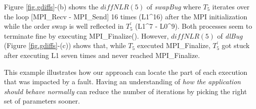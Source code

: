 Figure \ref{fig.gdiffs}-(b) shows the $diffNLR(5)$ of \textit{swapBug} where $T_5$ iterates over the loop [MPI\_Recv - MPI\_Send] 16 times (L1\^{}16) after the MPI initialization while the order swap is well reflected in $T_5^\prime$ (L1\^{}7 - L0\^{}9). Both processes seem to terminate fine by executing MPI\_Finalize(). 
However, $diffNLR(5)$ of \textit{dlBug} (Figure \ref{fig.gdiffs}-(c)) shows that, while $T_5$ executed MPI\_Finalize, $T_5^\prime$ got stuck after executing L1 seven times and never reached MPI\_Finalize.

This example illustrates how our approach can locate the part of each execution that was impacted by a fault. Having an understanding of \textit{how the application should behave normally} can reduce the number of iterations by picking the right set of parameters sooner. 







